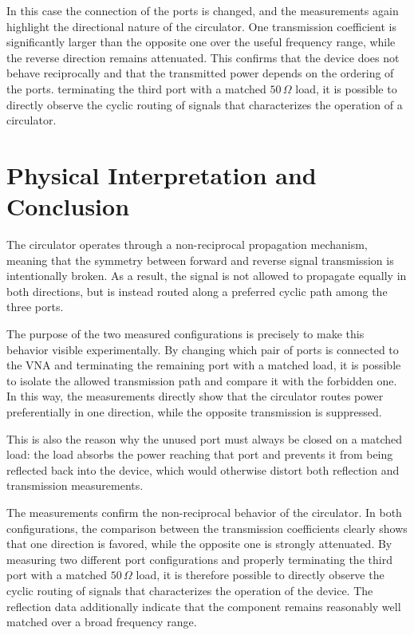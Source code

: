 In this case the connection of the ports is changed, and the measurements again highlight the directional nature of the circulator. One transmission coefficient is significantly larger than the opposite one over the useful frequency range, while the reverse direction remains attenuated. This confirms that the device does not behave reciprocally and that the transmitted power depends on the ordering of the ports.
terminating the third port with a matched $50\,\Omega$ load, it is possible to directly observe the cyclic routing of signals that characterizes the operation of a circulator.

\section{Physical Interpretation and Conclusion}

The circulator operates through a non-reciprocal propagation mechanism, meaning that the symmetry between forward and reverse signal transmission is intentionally broken. As a result, the signal is not allowed to propagate equally in both directions, but is instead routed along a preferred cyclic path among the three ports.

The purpose of the two measured configurations is precisely to make this behavior visible experimentally. By changing which pair of ports is connected to the VNA and terminating the remaining port with a matched load, it is possible to isolate the allowed transmission path and compare it with the forbidden one. In this way, the measurements directly show that the circulator routes power preferentially in one direction, while the opposite transmission is suppressed.

This is also the reason why the unused port must always be closed on a matched load: the load absorbs the power reaching that port and prevents it from being reflected back into the device, which would otherwise distort both reflection and transmission measurements.

The measurements confirm the non-reciprocal behavior of the circulator. In both configurations, the comparison between the transmission coefficients clearly shows that one direction is favored, while the opposite one is strongly attenuated. By measuring two different port configurations and properly terminating the third port with a matched $50\,\Omega$ load, it is therefore possible to directly observe the cyclic routing of signals that characterizes the operation of the device. The reflection data additionally indicate that the component remains reasonably well matched over a broad frequency range.
